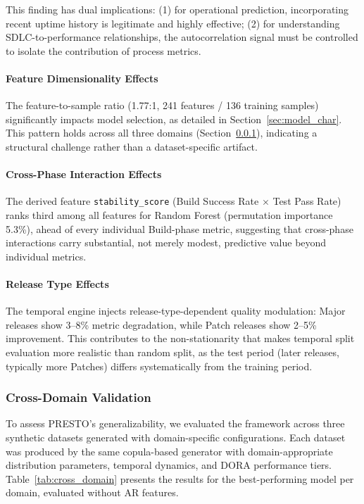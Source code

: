 \documentclass[technologies,article,submit,pdftex,moreauthors]{Definitions/mdpi}
\begin{document}
This finding has dual implications: (1) for operational prediction,
incorporating recent uptime history is legitimate and highly effective;
(2) for understanding SDLC-to-performance relationships, the
autocorrelation signal must be controlled to isolate the contribution of
process metrics.

\paragraph{Feature Dimensionality
Effects}\label{sec:dimensionality_effects}

The feature-to-sample ratio (1.77:1, 241 features / 136 training
samples) significantly impacts model selection, as detailed in Section~\ref{sec:model_char}. This pattern holds across all three domains (Section~\ref{sec:cross_domain}),
indicating a structural challenge rather than a dataset-specific
artifact.

\paragraph{Cross-Phase Interaction
Effects}\label{sec:cross_phase_effects}

The derived feature \texttt{stability\_score} (Build Success Rate
\(\times\) Test Pass Rate) ranks third among all features for Random
Forest (permutation importance 5.3\%), ahead of every individual
Build-phase metric, suggesting that cross-phase interactions carry
substantial, not merely modest, predictive value beyond individual
metrics.

\paragraph{Release Type Effects}\label{sec:release_type_effects}

The temporal engine injects release-type-dependent quality modulation:
Major releases show 3--8\% metric degradation, while Patch releases show
2--5\% improvement. This contributes to the non-stationarity that makes
temporal split evaluation more realistic than random split, as the test
period (later releases, typically more Patches) differs systematically
from the training period.

\subsubsection{Cross-Domain Validation}\label{sec:cross_domain}

To assess PRESTO's generalizability, we evaluated the framework across
three synthetic datasets generated with domain-specific configurations.
Each dataset was produced by the same copula-based generator with
domain-appropriate distribution parameters, temporal dynamics, and DORA
performance tiers. Table~\ref{tab:cross_domain} presents the results for
the best-performing model per domain, evaluated without AR features.
\end{document}
